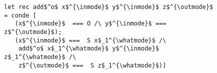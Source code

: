 \begin{figure}[!t]
  \centering
  \begin{minipage}{0.36\columnwidth}
    \begin{lstlisting}[frame=tb]
 let rec add$^o$ x$^{\inmode}$ y$^{\inmode}$ z$^{\outmode}$ = conde [
   (x$^{\inmode}$  === O /\ y$^{\inmode}$ ===  z$^{\outmode}$);
   (x$^{\inmode}$ ===  S x$_1^{\whatmode}$ /\
    add$^o$ x$_1^{\whatmode}$ y$^{\inmode}$ z$_1^{\whatmode}$ /\
    z$^{\outmode}$ ===  S z$_1^{\whatmode}$)]
    \end{lstlisting}
  \end{minipage}
\end{figure}